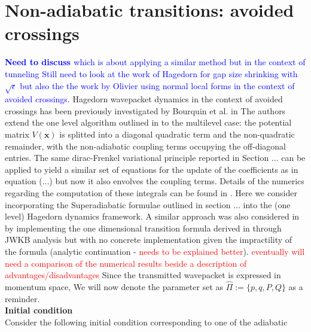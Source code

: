 \usepackage{amsmath}
\newtheorem{theorem}{Theorem}[section]
\newtheorem{corollary}{Corollary}[theorem]
\newtheorem{lemma}[theorem]{Lemma}


  \section{Non-adiabatic transitions: avoided crossings}
  \textcolor{blue}{
\textbf{Need to discuss \cite{gradinaruTunnelingDynamicsSpawning2010}}
 which is about applying a similar method but in the context of tunneling
Still need to look at the work of Hagedorn for 
gap size shrinking with $\sqrt{\epsilon}$ but also the 
the work by Olivier using normal local forms in the context 
of avoided crossings.} 
Hagedorn wavepacket dynamics in the context of avoided 
crossings has been previously investigated by Bourquin et al. in
\cite{bourquinNonadiabaticTransitionsAvoided2012} 
The authors extend the one level algorithm 
outlined in \cite{lubichQuantumClassicalMolecular2008} to the 
multilevel case: the potential matrix $V(\bm{x})$ is splitted
into a diagonal quadratic term and the non-quadratic remainder,
with the non-adiabatic coupling terms occupying the off-diagonal entries.
The same dirac-Frenkel variational principle reported in Section ...
can be applied to yield a similar set of equations for the update of the 
coefficients as in equation (...) but now it also envolves the coupling terms.
Details of the numerics regarding the computation of these integrals can be 
found in \cite{bourquinNumericalAlgorithmsSemiclassical2017}.
Here we consider incorporating the Superadiabatic formulae 
outlined in section ... into the (one level) Hagedorn dynamics framework.
A similar approach was also considered in 
\cite{bourquinNonadiabaticTransitionsAvoided2012} by implementing the 
one dimensional transition formula derived in
\cite{hagedornDeterminationNonadiabaticScattering2005} through JWKB analysis 
but with no concrete implementation given the impractility of 
the formula 
(analytic continuation - \textcolor{red}{needs to be explained better}).
\textcolor{red}{eventually will need a comparison of the numerical results
beside a description of advantages/disadvantages}
Since the transmitted wavepacket is expressed in momentum space,
We will now denote the parameter set as $\hat{\Pi} := \{p, q, P, Q\}$
as a reminder.
\\
\textbf{Initial condition}
\\
Consider the following initial condition corresponding to one of the adiabatic
